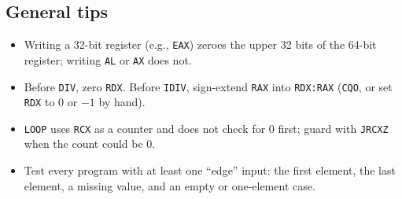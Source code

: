 \documentclass[11pt,letterpaper]{article}
\begin{document}
\subsection*{General tips}
\begin{itemize}[itemsep=2pt]
  \item Writing a 32-bit register (e.g., \texttt{EAX}) zeroes the upper 32 bits of the 64-bit register; writing \texttt{AL} or \texttt{AX} does not.
  \item Before \texttt{DIV}, zero \texttt{RDX}. Before \texttt{IDIV}, sign-extend \texttt{RAX} into \texttt{RDX:RAX} (\texttt{CQO}, or set \texttt{RDX} to 0 or $-1$ by hand).
  \item \texttt{LOOP} uses \texttt{RCX} as a counter and does not check for 0 first; guard with \texttt{JRCXZ} when the count could be 0.
  \item Test every program with at least one ``edge'' input: the first element, the last element, a missing value, and an empty or one-element case.
\end{itemize}
\end{document}
